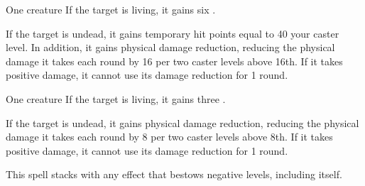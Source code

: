 \begin{spellheader}
    \spellrng{\rngclose}
    \spelldur{\durshort}
\end{spellheader}
\begin{spelleffects}
    \begin{spelltarget}{One creature}
        \spelleffect If the target is living, it gains six \negativelevels.

        \spelleffect If the target is undead, it gains temporary hit points equal to 40 \add your caster level. In addition, it gains physical damage reduction, reducing the physical damage it takes each round by 16  per two caster levels above 16th. If it takes positive damage, it cannot use its damage reduction for 1 round.
    \end{spelltarget}
\end{spelleffects}
\begin{spellfooter}
    
\end{spellfooter}

\begin{spellheader}
    \spellrng{\rngclose}
    \spelldur{\durshort}
\end{spellheader}
\begin{spelleffects}
    \begin{spelltarget}{One creature}
        \spelleffect If the target is living, it gains three \negativelevels.

        If the target is undead, it gains physical damage reduction, reducing the physical damage it takes each round by 8  per two caster levels above 8th. If it takes positive damage, it cannot use its damage reduction for 1 round.
    \end{spelltarget}
\end{spelleffects}
\begin{spellfooter}
    \spellnotes This spell stacks with any effect that bestows negative levels, including itself.
\end{spellfooter}

